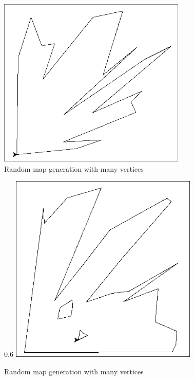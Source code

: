 \documentclass[progress]{cmpreport}
\begin{document}
\begin{appendix}
\begin{figure}[ht]
		\centering
		\includegraphics[width=0.8\textwidth]{FirstMappingLarge.jpg}
		\caption{Random map generation with many vertices}
		\label{fig:image2}
	\end{figure}


	\begin{figure}[b]{0.6\textwidth}
		\centering
		\includegraphics[width=0.8\textwidth]{FirstMappingLargeHoles.jpg}
		\caption{Random map generation with many vertices}
		\label{fig:image2}
	\end{figure}

\end{appendix}


\end{document}
